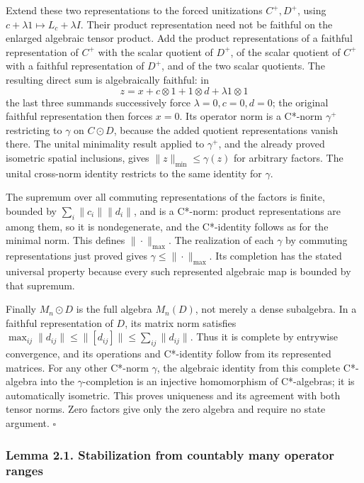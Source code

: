 \documentclass[
  11pt,
]{article}
\begin{document}
Extend these two representations to the forced unitizations \(C^+,D^+\),
using \(c+\lambda1\mapsto L_c+\lambda I\). Their product representation
need not be faithful on the enlarged algebraic tensor product. Add the
product representations of a faithful representation of \(C^+\) with the
scalar quotient of \(D^+\), of the scalar quotient of \(C^+\) with a
faithful representation of \(D^+\), and of the two scalar quotients. The
resulting direct sum is algebraically faithful: in \[
z=x+c\otimes1+1\otimes d+\lambda1\otimes1
\] the last three summands successively force \(\lambda=0,c=0,d=0\); the
original faithful representation then forces \(x=0\). Its operator norm
is a C*-norm \(\gamma^+\) restricting to \(\gamma\) on \(C\odot D\),
because the added quotient representations vanish there. The unital
minimality result applied to \(\gamma^+\), and the already proved
isometric spatial inclusions, gives \(\|z\|_{\min}\leq\gamma(z)\) for
arbitrary factors. The unital cross-norm identity restricts to the same
identity for \(\gamma\).

The supremum over all commuting representations of the factors is
finite, bounded by \(\sum_i\|c_i\|\|d_i\|\), and is a C*-norm: product
representations are among them, so it is nondegenerate, and the
C*-identity follows as for the minimal norm. This defines
\(\|\cdot\|_{\max}\). The realization of each \(\gamma\) by commuting
representations just proved gives \(\gamma\leq\|\cdot\|_{\max}\). Its
completion has the stated universal property because every such
represented algebraic map is bounded by that supremum.

Finally \(M_n\odot D\) is the full algebra \(M_n(D)\), not merely a
dense subalgebra. In a faithful representation of \(D\), its matrix norm
satisfies
\(\max_{ij}\|d_{ij}\|\leq\|[d_{ij}]\|\leq\sum_{ij}\|d_{ij}\|\). Thus it
is complete by entrywise convergence, and its operations and C*-identity
follow from its represented matrices. For any other C*-norm \(\gamma\),
the algebraic identity from this complete C*-algebra into the
\(\gamma\)-completion is an injective homomorphism of C*-algebras; it is
automatically isometric. This proves uniqueness and its agreement with
both tensor norms. Zero factors give only the zero algebra and require
no state argument. \(\square\)

\subsubsection{Lemma 2.1. Stabilization from countably many operator
ranges}\label{lemma-2.1.-stabilization-from-countably-many-operator-ranges}
\end{document}
